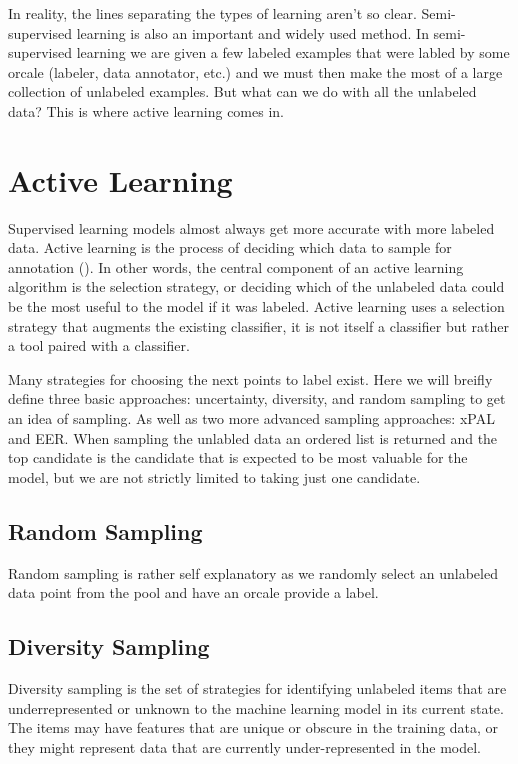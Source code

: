 In reality, the lines separating the types of learning aren't so clear. Semi-supervised learning is also an important and widely used method. In semi-supervised learning we are given a few labeled examples that were labled by some orcale (labeler, data annotator, etc.) and we must then make the most of a large collection of unlabeled examples. But what can we do with all the unlabeled data? This is where active learning comes in.



\section{Active Learning}
Supervised learning models almost always get more accurate with more labeled data. Active learning is the process of deciding which data to sample for annotation (\cite{munro2021human}). In other words, the central component of an active learning algorithm is the selection strategy, or deciding which of the unlabeled data could be the most useful to the model if it was labeled. Active learning uses a selection strategy that augments the existing classifier, it is not itself a classifier but rather a tool paired with a classifier.

Many strategies for choosing the next points to label exist. Here we will breifly define three basic approaches: uncertainty, diversity, and random sampling to get an idea of sampling. As well as two more advanced sampling approaches: xPAL and EER. When sampling the unlabled data an ordered list is returned and the top candidate is the candidate that is expected to be most valuable for the model, but we are not strictly limited to taking just one candidate.

\subsection{Random Sampling}
Random sampling is rather self explanatory as we randomly select an unlabeled data point from the pool and have an orcale provide a label.

\subsection{Diversity Sampling}
Diversity sampling is the set of strategies for identifying unlabeled items that are underrepresented or unknown to the machine learning model in its current state. The items may have features that are unique or obscure in the training data, or they might represent data that are currently under-represented in the model. 

